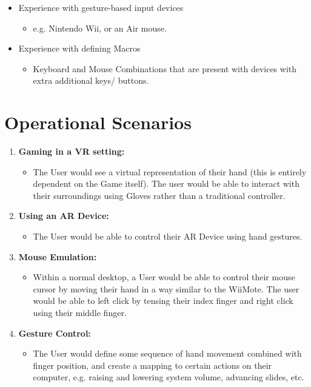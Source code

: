 \documentclass[12pt,a4paper,oneside]{book}
\theoremstyle{plain}
\numberwithin{equation}{chapter}
\begin{document}
\begin{itemize}
    \item Experience with gesture-based input devices
    \begin{itemize}
        \item e.g. Nintendo Wii, or an Air mouse.
    \end{itemize}
    \item Experience with defining Macros
    \begin{itemize}
        \item Keyboard and Mouse Combinations that are present with devices with extra additional keys/ buttons.
    \end{itemize}
\end{itemize}

\section{Operational Scenarios}

\begin{enumerate}
\item \textbf{Gaming in a VR setting:}
\begin{itemize}
    \item The User would see a virtual representation of their hand (this is entirely dependent on the Game itself). The user would be able to interact with their surroundings using Gloves rather than a traditional controller.
\end{itemize}

\item \textbf{Using an AR Device:}
\begin{itemize}
    \item The User would be able to control their AR Device using hand gestures.
\end{itemize}


\item \textbf{Mouse Emulation:}
\begin{itemize}
    \item Within a normal desktop, a User would be able to control their mouse cursor by moving their hand in a way similar to the WiiMote. The user would be able to left click by tensing their index finger and right click using their middle finger.
\end{itemize}


\item \textbf{Gesture Control:}
\begin{itemize}
    \item The User would define some sequence of hand movement combined with finger position, and create a mapping to certain actions on their computer, e.g. raising and lowering system volume, advancing slides, etc.
\end{itemize}

\end{enumerate}
\end{document}
